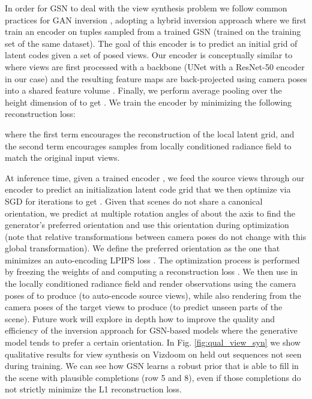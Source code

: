 \documentclass[10pt,twocolumn,letterpaper]{article}
\begin{document}
In order for GSN to deal with the view synthesis problem we follow common practices for GAN inversion \cite{ganinversion}, adopting a hybrid inversion approach where we first train an encoder  on  tuples sampled from a trained GSN (trained on the training set of the same dataset). The goal of this encoder is to predict an initial grid of latent codes  given a set of posed views. Our encoder is conceptually similar to \cite{mvsmachine,atlas} where views  are first processed with a backbone (UNet \cite{unet} with a ResNet-50 encoder in our case) and the resulting feature maps are back-projected using camera poses  into a shared feature volume . Finally, we perform average pooling over the height dimension of  to get . We train the encoder by minimizing the following reconstruction loss:



where the first term encourages the reconstruction of the local latent grid, and the second term encourages samples from locally conditioned radiance field  to match the original input views.

At inference time, given a trained encoder , we feed the source views  through our encoder to predict an initialization latent code grid  that we then optimize via SGD for  iterations to get . Given that scenes do not share a canonical orientation, we predict  at multiple rotation angles of  about the axis to find the generator's preferred orientation and use this orientation during optimization (note that relative transformations between camera poses do not change with this global transformation). We define the preferred orientation as the one that minimizes an auto-encoding LPIPS loss \cite{lpips}. The optimization process is performed by freezing the weights of  and computing a reconstruction loss \wrt . We then use  in the locally conditioned radiance field and render observations using the camera poses of  to produce  (\ie to auto-encode source views), while also rendering from the camera poses of the target views  to produce  (\ie to predict unseen parts of the scene). Future work will explore in depth how to improve the quality and efficiency of the inversion approach for GSN-based models where the generative model tends to prefer a certain orientation. In Fig. \ref{fig:qual_view_syn} we show qualitative results for view synthesis on Vizdoom on held out sequences not seen during training. We can see how GSN learns a robust prior that is able to fill in the scene with plausible completions (\eg row 5 and 8), even if those completions do not strictly minimize the L1 reconstruction loss. 
\end{document}
